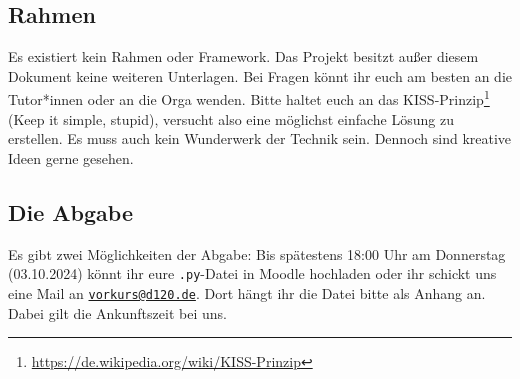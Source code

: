 \subsection*{Rahmen}
Es existiert kein Rahmen oder Framework. Das Projekt besitzt außer diesem Dokument keine weiteren Unterlagen. Bei Fragen könnt ihr euch am besten an die Tutor*innen oder an die Orga wenden. Bitte haltet euch an das KISS-Prinzip\footnote[2]{\url{https://de.wikipedia.org/wiki/KISS-Prinzip}} (Keep it simple, stupid), versucht also eine möglichst einfache Lösung zu erstellen. Es muss auch kein Wunderwerk der Technik sein. Dennoch sind kreative Ideen gerne gesehen.

\subsection*{Die Abgabe}
Es gibt zwei Möglichkeiten der Abgabe: Bis spätestens 18:00 Uhr am Donnerstag (03.10.2024) könnt ihr eure \texttt{.py}-Datei in Moodle hochladen oder ihr schickt uns eine Mail an \href{mailto:vorkurs@d120.de}{\nolinkurl{vorkurs@d120.de}}. Dort hängt ihr die Datei bitte als Anhang an. Dabei gilt die Ankunftszeit bei uns.

